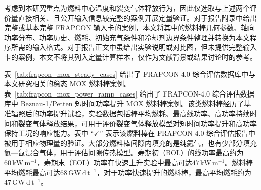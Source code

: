 考虑到本研究重点为燃料中心温度和裂变气体释放行为，因此仅选取与上述两个评价量直接相关、且公开输入信息较完整的案例开展定量验证。对于报告附录中给出完整或基本完整 FRAPCON 输入卡的案例，本文将其中的燃料棒几何参数、轴向功率分布、功率历史、燃耗、初始充气条件和冷却剂边界条件整理并转换为本文程序所需的输入格式。对于报告正文中虽给出实验说明或对比图，但未提供完整输入卡的案例，本文不将其列入定量计算样本，仅作为文献背景或结果讨论时的参考。

表~\ref{tab:frapcon_mox_steady_cases} 给出了 FRAPCON-4.0 综合评估数据库中与本文研究相关的稳态 MOX 燃料棒案例。表~\ref{tab:frapcon_mox_power_ramp_cases} 给出了 FRAPCON-4.0 综合评估数据库中 Beznau-1/Petten 短时间功率提升 MOX 燃料棒案例\cite{ML16118A434}。该类燃料棒经历了基准辐照后的功率提升试验，实验数据包括棒平均燃耗、最高线功率、高功率持续时间和裂变气体释放结果，可用于评价裂变气体释放模型对短时间功率提升和高功率保持工况的响应能力。表中 ``$\checkmark$'' 表示该燃料棒在 FRAPCON-4.0 综合评估报告中被用于相应物理量的验证。大部分燃料棒间隙内填充的是纯氦气，也有少部分填充氦—氙混合气体，用于评估间隙传热模型。寿期初（BOL）的线功率最高约为$60\,\mathrm{kW\,m^{-1}}$，寿期末（EOL）功率在快速上升实验中最高可达$47\,\mathrm{kW\,m^{-1}}$。燃料棒平均燃耗最高可达$68\,\mathrm{GW\,d\,t^{-1}}$，对于功率快速提升的燃料棒，最高平均燃耗约为$47\,\mathrm{GW\,d\,t^{-1}}$。

